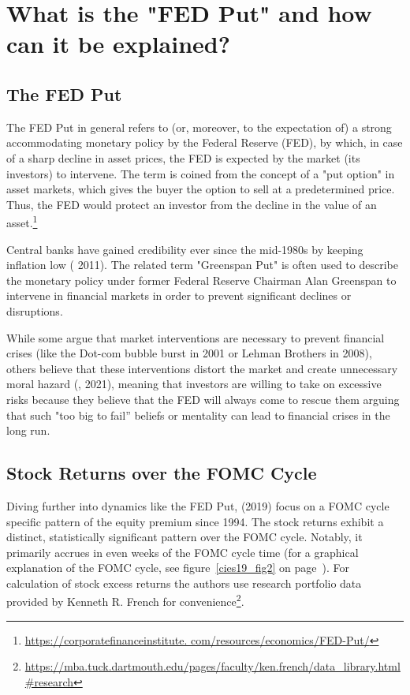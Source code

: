 \chapter{What is the "FED Put" and how can it be explained?}
\section{The FED Put}
The FED Put in general refers to (or, moreover, to the expectation of) a strong accommodating monetary policy by the Federal Reserve (FED), by which, in case of a sharp decline in asset prices, the FED is expected by the market (its investors) to intervene. The term is coined from the concept of a "put option" in asset markets, which gives the buyer the option to sell at a predetermined price. Thus, the FED would protect an investor from the decline in the value of an asset.\footnote{\url{https://corporatefinanceinstitute. com/resources/economics/FED-Put/}}

Central banks have gained credibility ever since the mid-1980s by keeping inflation low (\cite{hall_is_2011} 2011). The related term "Greenspan Put" is often used to describe the monetary policy under former Federal Reserve Chairman Alan Greenspan to intervene in financial markets in order to prevent significant declines or disruptions. 

While some argue that market interventions are necessary to prevent financial crises (like the Dot-com bubble burst in 2001 or Lehman Brothers in 2008), others believe that these interventions distort the market and create unnecessary moral hazard (\cite{cieslak_economics_2021},  2021),  meaning that investors are willing to take on excessive risks because they believe that the FED will always come to rescue them arguing that such "too big to fail” beliefs or mentality can lead to financial crises in the long run.

\section{Stock Returns over the FOMC Cycle}

Diving further into dynamics like the FED Put,  \cite{cieslak_stock_2019} (2019) focus on a FOMC cycle specific pattern of the equity premium since 1994. 
The stock returns exhibit a distinct,  statistically significant pattern over the FOMC cycle.  Notably,  it primarily accrues in even weeks of the FOMC cycle time (for a graphical explanation of the FOMC cycle, see figure~\ref{cies19_fig2} on page~\pageref{cies19_fig2}). For calculation of stock excess returns the authors use research portfolio data provided by Kenneth R. French for convenience\footnote{\url{https://mba.tuck.dartmouth.edu/pages/faculty/ken.french/data_library.html\#research}}.

